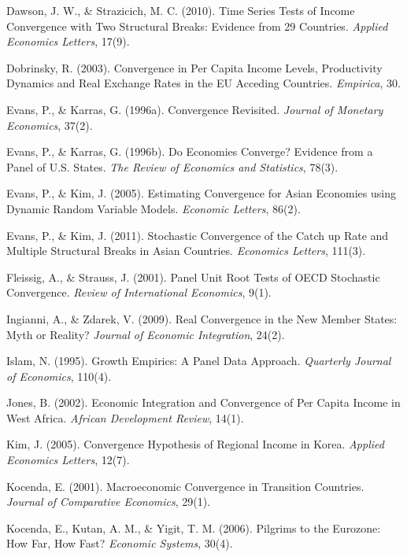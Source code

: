 \documentclass{crebsshr}
\begin{document}
\begin{thebibliography}{160}
Dawson, J. W., \& Strazicich, M. C. (2010). Time Series Tests of Income Convergence with Two Structural Breaks: Evidence from 29 Countries. \emph{Applied Economics Letters}, 17(9).

Dobrinsky, R. (2003). Convergence in Per Capita Income Levels, Productivity Dynamics and Real Exchange Rates in the EU Acceding Countries. \emph{Empirica}, 30.

Evans, P., \& Karras, G. (1996a). Convergence Revisited. \emph{Journal of Monetary Economics}, 37(2).

Evans, P., \& Karras, G. (1996b). Do Economies Converge? Evidence from a Panel of U.S. States. \emph{The Review of Economics and Statistics}, 78(3).

Evans, P., \& Kim, J. (2005). Estimating Convergence for Asian Economies using Dynamic Random Variable Models. \emph{Economic Letters}, 86(2).

Evans, P., \& Kim, J. (2011). Stochastic Convergence of the Catch up Rate and Multiple Structural Breaks in Asian Countries. \emph{Economics Letters}, 111(3).

Fleissig, A., \& Strauss, J. (2001). Panel Unit Root Tests of OECD Stochastic Convergence. \emph{Review of International Economics}, 9(1).

Ingianni, A., \& Zdarek, V. (2009). Real Convergence in the New Member States: Myth or Reality? \emph{Journal of Economic Integration}, 24(2).

Islam, N. (1995). Growth Empirics: A Panel Data Approach. \emph{Quarterly Journal of Economics}, 110(4).

Jones, B. (2002). Economic Integration and Convergence of Per Capita Income in West Africa. \emph{African Development Review}, 14(1).

Kim, J. (2005). Convergence Hypothesis of Regional Income in Korea. \emph{Applied Economics Letters}, 12(7).

Kocenda, E. (2001). Macroeconomic Convergence in Transition Countries. \emph{Journal of Comparative Economics}, 29(1).

Kocenda, E., Kutan, A. M., \& Yigit, T. M. (2006). Pilgrims to the Eurozone: How Far, How Fast? \emph{Economic Systems}, 30(4).


\end{thebibliography}
\end{document}
